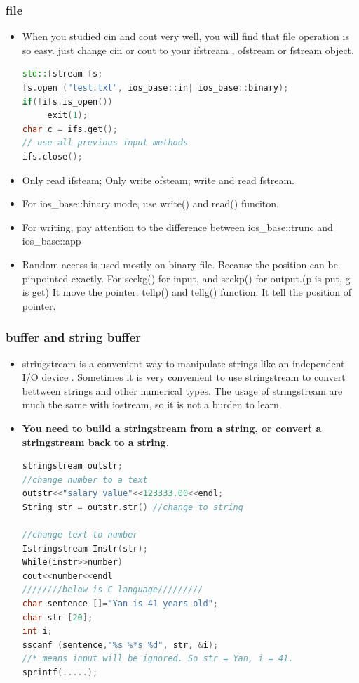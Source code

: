 \documentclass[a4paper,12pt,twoside]{book}
\begin{document}
\subsubsection{file}
\begin{itemize}
\item 	When you studied cin and cout very well, you will find that file operation is so easy. just change cin or cout to your ifstream , ofstream or fstream object.

\begin{lstlisting}[frame=single, language=c++]
std::fstream fs;
fs.open ("test.txt", ios_base::in| ios_base::binary);
if(!ifs.is_open())
     exit(1);
char c = ifs.get();
// use all previous input methods
ifs.close();
\end{lstlisting}


\item Only read ifsteam;  Only write ofsteam; write and read fstream.

\item For ios\_base::binary mode, use write() and read() funciton.

\item For writing, pay attention to the difference between ios\_base::trunc and ios\_base::app

\item Random access is used mostly on binary file. Because the position can be pinpointed exactly. For seekg() for input, and seekp() for output.(p is put, g is get) It move the pointer. tellp() and tellg() function.  It tell the position of pointer.

\end{itemize}

\subsubsection{buffer and string buffer}

\begin{itemize}


\item stringstream is a convenient way to manipulate strings like an independent I/O device .
Sometimes it is very convenient to use stringstream to convert bettween strings and other numerical types. The usage of stringstream are much the same with iostream, so it is not a burden to learn.  

\item \textbf{You need to build a stringstream from a string, or convert a stringstream back to a string.}

\begin{lstlisting}[frame=single, language=c++]
stringstream outstr;
//change number to a text
outstr<<"salary value"<<123333.00<<endl;
String str = outstr.str() //change to string

//change text to number
Istringstream Instr(str);
While(instr>>number)
cout<<number<<endl
////////below is C language/////////
char sentence []="Yan is 41 years old";
char str [20];
int i;
sscanf (sentence,"%s %*s %d", str, &i);
//* means input will be ignored. So str = Yan, i = 41.
sprintf(.....);
\end{lstlisting}

\end{itemize}
\end{document}
